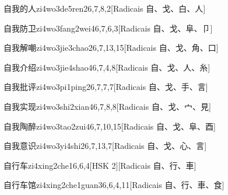 \begin{entry}{自我的人}{zi4wo3de5ren2}{6,7,8,2}[Radicais ⾃、⼽、⽩、⼈]
\end{entry}

\begin{entry}{自我防卫}{zi4wo3fang2wei4}{6,7,6,3}[Radicais ⾃、⼽、⾩、⼙]
\end{entry}

\begin{entry}{自我解嘲}{zi4wo3jie3chao2}{6,7,13,15}[Radicais ⾃、⼽、⾓、⼝]
\end{entry}

\begin{entry}{自我介绍}{zi4wo3jie4shao4}{6,7,4,8}[Radicais ⾃、⼽、⼈、⽷]
\end{entry}

\begin{entry}{自我批评}{zi4wo3pi1ping2}{6,7,7,7}[Radicais ⾃、⼽、⼿、⾔]
\end{entry}

\begin{entry}{自我实现}{zi4wo3shi2xian4}{6,7,8,8}[Radicais ⾃、⼽、⼧、⾒]
\end{entry}

\begin{entry}{自我陶醉}{zi4wo3tao2zui4}{6,7,10,15}[Radicais ⾃、⼽、⾩、⾣]
\end{entry}

\begin{entry}{自我意识}{zi4wo3yi4shi2}{6,7,13,7}[Radicais ⾃、⼽、⼼、⾔]
\end{entry}

\begin{entry}{自行车}{zi4xing2che1}{6,6,4}[HSK 2][Radicais ⾃、⾏、⾞]
\end{entry}

\begin{entry}{自行车馆}{zi4xing2che1guan3}{6,6,4,11}[Radicais ⾃、⾏、⾞、⾷]
\end{entry}

